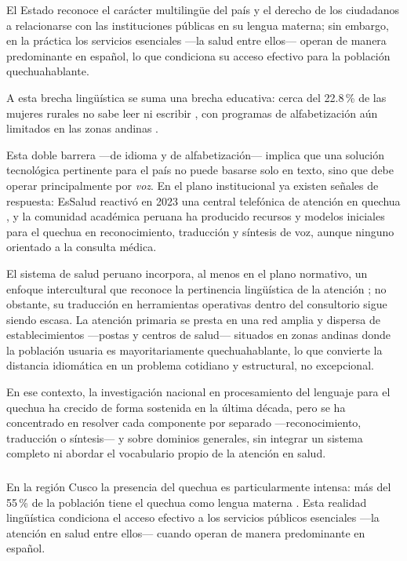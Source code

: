 \begin{bloqueObsDos}
\noindent El Estado reconoce el car{\'a}cter multiling{\"u}e del pa{\'i}s y el derecho de los
ciudadanos a relacionarse con las instituciones p{\'u}blicas en su lengua materna; sin embargo, en
la pr{\'a}ctica los servicios esenciales ---la salud entre ellos--- operan de manera predominante en
espa{\~n}ol, lo que condiciona su acceso efectivo para la poblaci{\'o}n quechuahablante.

\noindent A esta
brecha ling{\"u}{\'i}stica se suma una brecha educativa: cerca del 22.8\,\% de las mujeres rurales no
sabe leer ni escribir \parencite{inei2023}, con programas de alfabetizaci{\'o}n a{\'u}n limitados en
las zonas andinas \parencite{dispurse2023}.

\noindent Esta doble barrera ---de idioma y de
alfabetizaci{\'o}n--- implica que una soluci{\'o}n tecnol{\'o}gica pertinente para el pa{\'i}s no
puede basarse solo en texto, sino que debe operar principalmente por \emph{voz}. En el plano
institucional ya existen se{\~n}ales de respuesta: EsSalud reactiv{\'o} en 2023 una central
telef{\'o}nica de atenci{\'o}n en quechua \parencite{essalud2023}, y la comunidad acad{\'e}mica
peruana ha producido recursos y modelos iniciales para el quechua en reconocimiento, traducci{\'o}n
y s{\'i}ntesis de voz, aunque ninguno orientado a la consulta m{\'e}dica.

\noindent El sistema de salud peruano incorpora, al menos en el plano normativo, un enfoque
intercultural que reconoce la pertinencia ling{\"u}{\'i}stica de la atenci{\'o}n
\parencite{minsa2016intercultural}; no obstante, su
traducci{\'o}n en herramientas operativas dentro del consultorio sigue siendo escasa. La atenci{\'o}n
primaria se presta en una red amplia y dispersa de establecimientos ---postas y centros de salud---
situados en zonas andinas donde la poblaci{\'o}n usuaria es mayoritariamente quechuahablante, lo que
convierte la distancia idiom{\'a}tica en un problema cotidiano y estructural, no excepcional.

\noindent En ese
contexto, la investigaci{\'o}n nacional en procesamiento del lenguaje para el quechua ha crecido de
forma sostenida en la {\'u}ltima d{\'e}cada, pero se ha concentrado en resolver cada componente por
separado ---reconocimiento, traducci{\'o}n o s{\'i}ntesis--- y sobre dominios generales, sin integrar
un sistema completo ni abordar el vocabulario propio de la atenci{\'o}n en salud.
\end{bloqueObsDos}

\subsubsection{}
En la regi{\'o}n Cusco la presencia del quechua es particularmente intensa: m{\'a}s del
55\,\% de la poblaci{\'o}n tiene el quechua como lengua materna \parencite{inei2017}. Esta
realidad ling{\"u}{\'i}stica condiciona el acceso efectivo a los servicios p{\'u}blicos
esenciales ---la atenci{\'o}n en salud entre ellos--- cuando operan de manera predominante en
espa{\~n}ol.

